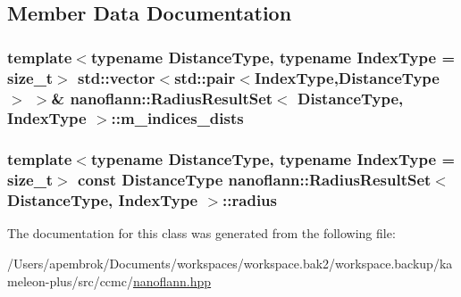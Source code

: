 \subsection{Member Data Documentation}
\hypertarget{classnanoflann_1_1_radius_result_set_a88e8929d22445f82691a4d87969d4b99}{
\subsubsection[{m\-\_\-indices\-\_\-dists}]{\setlength{\rightskip}{0pt plus 5cm}template$<$typename Distance\-Type, typename Index\-Type = size\-\_\-t$>$ std\-::vector$<$std\-::pair$<$Index\-Type,Distance\-Type$>$ $>$\& {\bf nanoflann\-::\-Radius\-Result\-Set}$<$ Distance\-Type, Index\-Type $>$\-::m\-\_\-indices\-\_\-dists}}\label{classnanoflann_1_1_radius_result_set_a88e8929d22445f82691a4d87969d4b99}
\hypertarget{classnanoflann_1_1_radius_result_set_a427684c7ff35ce0bf50075a5cc062d42}{
\subsubsection[{radius}]{\setlength{\rightskip}{0pt plus 5cm}template$<$typename Distance\-Type, typename Index\-Type = size\-\_\-t$>$ const Distance\-Type {\bf nanoflann\-::\-Radius\-Result\-Set}$<$ Distance\-Type, Index\-Type $>$\-::radius}}\label{classnanoflann_1_1_radius_result_set_a427684c7ff35ce0bf50075a5cc062d42}


The documentation for this class was generated from the following file\-:\begin{DoxyCompactItemize}
\item 
/\-Users/apembrok/\-Documents/workspaces/workspace.\-bak2/workspace.\-backup/kameleon-\/plus/src/ccmc/\hyperlink{nanoflann_8hpp}{nanoflann.\-hpp}\end{DoxyCompactItemize}
